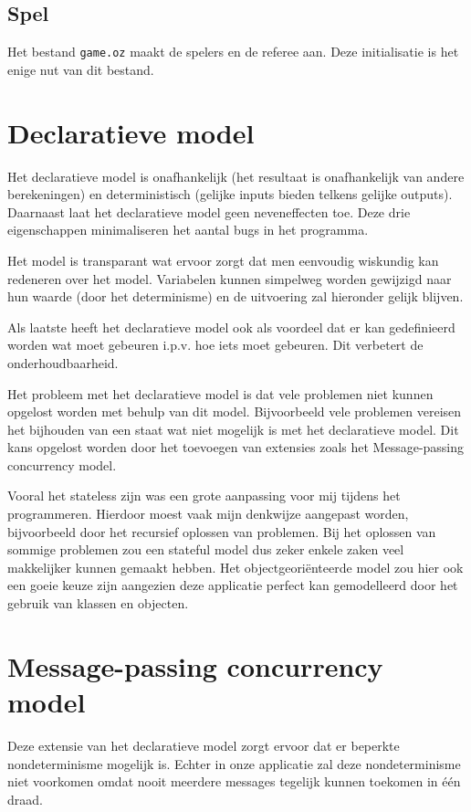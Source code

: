 \documentclass{article}
\begin{document}
\subsection{Spel}
Het bestand \texttt{game.oz} maakt de spelers en de referee aan. Deze initialisatie is het enige nut van dit bestand. 

\section{Declaratieve model}
Het declaratieve model is onafhankelijk (het resultaat is onafhankelijk van andere berekeningen) en deterministisch (gelijke inputs bieden telkens gelijke outputs). 
Daarnaast laat het declaratieve model geen neveneffecten toe. 
Deze drie eigenschappen minimaliseren het aantal bugs in het programma. 

Het model is transparant wat ervoor zorgt dat men eenvoudig wiskundig kan redeneren over het model. Variabelen kunnen simpelweg worden gewijzigd naar hun waarde (door het determinisme) en de uitvoering zal hieronder gelijk blijven. 

Als laatste heeft het declaratieve model ook als voordeel dat er kan gedefinieerd worden wat moet gebeuren i.p.v. hoe iets moet gebeuren. Dit verbetert de onderhoudbaarheid.

Het probleem met het declaratieve model is dat vele problemen niet kunnen opgelost worden met behulp van dit model. Bijvoorbeeld vele problemen vereisen het bijhouden van een staat wat niet mogelijk is met het declaratieve model.  Dit kans opgelost worden door het toevoegen van extensies zoals het Message-passing concurrency model. 

Vooral het stateless zijn was een grote aanpassing voor mij tijdens het programmeren. Hierdoor moest vaak mijn denkwijze aangepast worden, bijvoorbeeld door het recursief oplossen van problemen. Bij het oplossen van sommige problemen zou een stateful model dus zeker enkele zaken veel makkelijker kunnen gemaakt hebben. Het objectgeoriënteerde model zou hier ook een goeie keuze zijn aangezien deze applicatie perfect kan gemodelleerd door het gebruik van klassen en objecten.

\section{Message-passing concurrency model}
Deze extensie van het declaratieve model zorgt ervoor dat er beperkte nondeterminisme mogelijk is. Echter in onze applicatie zal deze nondeterminisme niet voorkomen omdat nooit meerdere messages tegelijk kunnen toekomen in één draad. 
\end{document}
